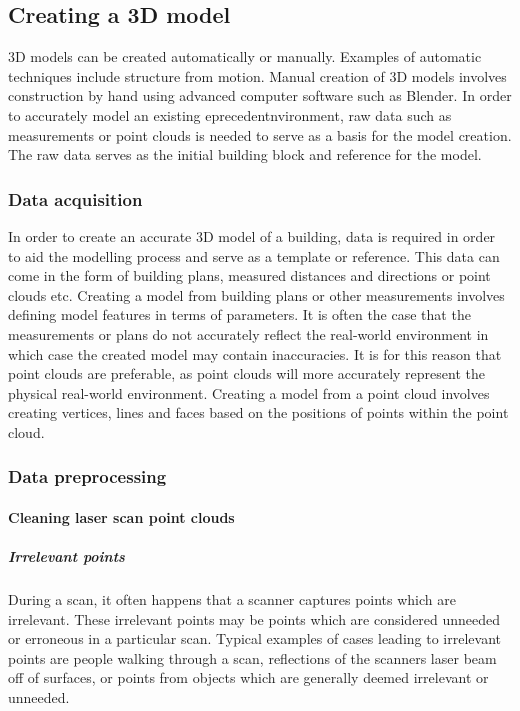 \documentclass[11pt,a4paper]{report}
\begin{document}
		\subsection{Creating a 3D model}
			3D models can be created automatically or manually. Examples of automatic techniques include structure from motion. Manual creation of 3D models involves construction by hand using advanced computer software such as Blender. 
			In order to accurately model an existing eprecedentnvironment, raw data such as measurements or point clouds is needed to serve as a basis for the model creation. The raw data serves as the initial building block and reference for the model.
		
			\subsubsection{Data acquisition}
				In order to create an accurate 3D model of a building, data is required in order to aid the modelling process and serve as a template or reference.
				This data can come in the form of building plans, measured distances and directions or point clouds etc.
				Creating a model from building plans or other measurements involves defining model features in terms of parameters.
				It is often the case that the measurements or plans do not accurately reflect the real-world environment in which case the created model may contain inaccuracies. It is for this reason that point clouds are preferable, as point clouds will more accurately represent the physical real-world environment.
				Creating a model from a point cloud involves creating vertices, lines and faces based on the positions of points  within the point cloud.
				
			\subsubsection{Data preprocessing}
				\paragraph{Cleaning laser scan point clouds}
					\subparagraph{Irrelevant points}
						During a scan, it often happens that a scanner captures points which are irrelevant. These irrelevant points may be points which are considered unneeded or erroneous in a particular scan. Typical examples of cases leading to irrelevant points are people walking through a scan, reflections of the scanners laser beam off of surfaces, or points from objects which are generally deemed irrelevant or unneeded.
						
\end{document}
